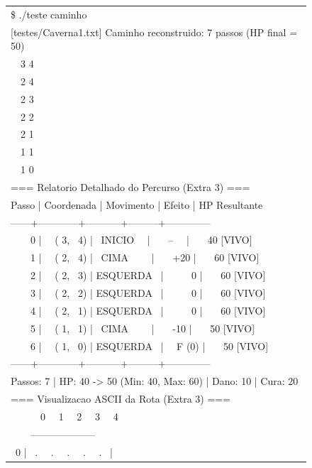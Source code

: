 \documentclass[12pt,a4paper]{article}
\makeatletter
\DeclareRobustCommand{\_}{%
  \ifmmode
    \nfss@text{\textunderscore}%
  \else
    \textunderscore\allowbreak
  \fi
}
\makeatother
\begin{document}
\begin{figure}[htbp]
    \centering
    \begin{minipage}{0.85\textwidth}
        \ttfamily\small
        \begin{tabular}{|l|}
        \hline
        \$ ./teste\_caminho \\
        {[testes/Caverna1.txt]} Caminho reconstruido: 7 passos (HP final = 50) \\
        \ \ 3 4 \\
        \ \ 2 4 \\
        \ \ 2 3 \\
        \ \ 2 2 \\
        \ \ 2 1 \\
        \ \ 1 1 \\
        \ \ 1 0 \\[0.15cm]
        === Relatorio Detalhado do Percurso (Extra 3) === \\
        Passo | Coordenada | Movimento | Efeito  | HP Resultante \\
        ------+------------+-----------+---------+-------------- \\
        \ \ \ \ 0 | \ \ ( 3, \ 4) | \ INICIO \ \ | \ \ \ -- \ \ | \ \ \ 40 [VIVO] \\
        \ \ \ \ 1 | \ \ ( 2, \ 4) | \ CIMA \ \ \ \ | \ \ \ +20 | \ \ \ 60 [VIVO] \\
        \ \ \ \ 2 | \ \ ( 2, \ 3) | ESQUERDA \ | \ \ \ \ \ 0 | \ \ \ 60 [VIVO] \\
        \ \ \ \ 3 | \ \ ( 2, \ 2) | ESQUERDA \ | \ \ \ \ \ 0 | \ \ \ 60 [VIVO] \\
        \ \ \ \ 4 | \ \ ( 2, \ 1) | ESQUERDA \ | \ \ \ \ \ 0 | \ \ \ 60 [VIVO] \\
        \ \ \ \ 5 | \ \ ( 1, \ 1) | \ CIMA \ \ \ \ | \ \ \ -10 | \ \ \ 50 [VIVO] \\
        \ \ \ \ 6 | \ \ ( 1, \ 0) | ESQUERDA \ | \ \ F (0) | \ \ \ 50 [VIVO] \\
        ------+------------+-----------+---------+-------------- \\
        Passos: 7 | HP: 40 -> 50 (Min: 40, Max: 60) | Dano: 10 | Cura: 20 \\[0.15cm]
        === Visualizacao ASCII da Rota (Extra 3) === \\
        \ \ \ \ \ \ 0 \ \ 1 \ \ 2 \ \ 3 \ \ 4 \\
        \ \ \ \ -------------------- \\
        \ 0 | \ . \ \ . \ \ . \ \ . \ \ . \ | \\

\end{tabular}
\end{minipage}
\end{figure}
\end{document}
